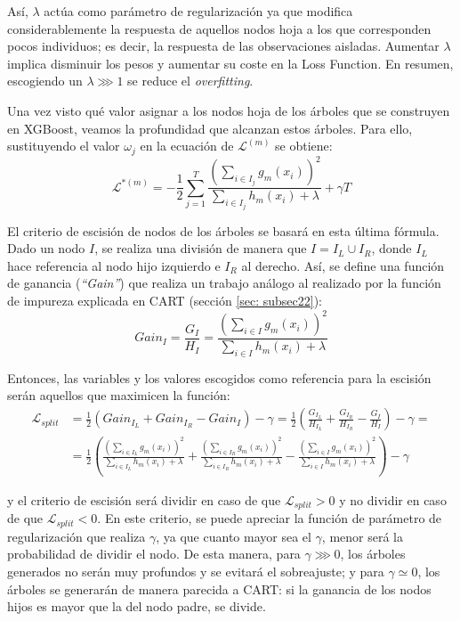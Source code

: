 \documentclass[12pt,twoside]{article}
\begin{document}
Así, $\lambda$ actúa como parámetro de regularización ya que modifica considerablemente la respuesta de aquellos nodos hoja a los que corresponden pocos individuos; es decir, la respuesta de las observaciones aisladas. Aumentar $\lambda$ implica disminuir los pesos y aumentar su coste en la Loss Function. En resumen, escogiendo un $\lambda \ggg 1$ se reduce el \textit{overfitting}.

Una vez visto qué valor asignar a los nodos hoja de los árboles que se construyen en XGBoost, veamos la profundidad que alcanzan estos árboles. Para ello, sustituyendo el valor $\omega_j$ en la ecuación de $\mathcal{L}^{(m)}$ se obtiene:
\begin{equation*}
\mathcal{L}^{*(m)} = - \frac{1}{2} \sum_{j = 1}^T \frac{\left( \sum_{i \in I_j} g_m(x_i) \right)^2}{\sum_{i \in I_j} h_m(x_i) + \lambda} + \gamma T 
\end{equation*}

El criterio de escisión de nodos de los árboles se basará en esta última fórmula. Dado un nodo $I$, se realiza una división de manera que $I = I_L \cup I_R$, donde $I_L$ hace referencia al nodo hijo izquierdo e $I_R$ al derecho. Así, se define una función de ganancia (\textit{``Gain''}) que realiza un trabajo análogo al realizado por la función de impureza explicada en CART (sección \ref{sec: subsec22}):
\begin{equation*}
Gain_I = \frac{G_I}{H_I} = \frac{\left( \sum_{i \in I} g_m(x_i) \right)^2}{\sum_{i \in I} h_m(x_i) + \lambda}
\end{equation*}

Entonces, las variables y los valores escogidos como referencia para la escisión serán aquellos que maximicen la función:
\begin{equation*}
\begin{split}
\mathcal{L}_{split} &= \frac{1}{2} \left( Gain_{I_L} + Gain_{I_R} - Gain_{I} \right) - \gamma = \frac{1}{2} \left( \frac{G_{I_L}}{H_{I_L}} + \frac{G_{I_R}}{H_{I_R}} - \frac{G_I}{H_I} \right) - \gamma = \\
&= \frac{1}{2} \left( \frac{\left( \sum_{i \in I_L} g_m(x_i) \right)^2}{\sum_{i \in I_L} h_m(x_i) + \lambda} + \frac{\left( \sum_{i \in I_R} g_m(x_i) \right)^2}{\sum_{i \in I_R} h_m(x_i) + \lambda} - \frac{\left( \sum_{i \in I} g_m(x_i) \right)^2}{\sum_{i \in I} h_m(x_i) + \lambda} \right)   - \gamma
\end{split}
\end{equation*}

\noindent
y el criterio de escisión será dividir en caso de que $\mathcal{L}_{split} > 0$ y no dividir en caso de que $\mathcal{L}_{split} < 0$. En este criterio, se puede apreciar la función de parámetro de regularización que realiza $\gamma$, ya que cuanto mayor sea el $\gamma$, menor será la probabilidad de dividir el nodo. De esta manera, para $\gamma \ggg 0$, los árboles generados no serán muy profundos y se evitará el sobreajuste; y para $\gamma \simeq 0$, los árboles se generarán de manera parecida a CART: si la ganancia de los nodos hijos es mayor que la del nodo padre, se divide.
\end{document}
